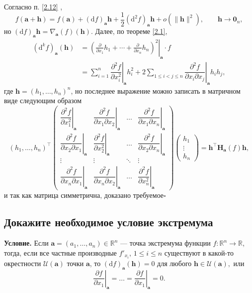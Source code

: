 \documentclass[a4paper]{article}
\newcommand{\qed}{\hfill$\square$}
\newcommand{\m}[1]{\mathbf{#1}}
\begin{document}
Согласно п. \ref{2.12} , 
$$
f(\m{a} + \m{h}) = f(\m{a}) + (\mathrm{d}f)_\m{a} \m{h} + \frac{1}{2} (\mathrm{d}^2f)_\m{a}\m{h} + o(\| \m{h} \|^2), \qquad \m{h} \to \m{0}_n,
$$
но $(\mathrm{d}f)_\m{a} \m{h} = \nabla_\m{a}(f)(\m{h})$. Далее, по теореме \ref{2.1},
$$\begin{aligned}
(\mathrm{d}^kf)_\m{a}(\m{h})  &= \left.\left(\frac{\partial}{\partial x_1} h_1 + \cdots + \frac{\partial }{\partial x_n}h_n \right)^2\right|_{\m{a}} \cdot f \\
&= \sum_{i=1}^n \left.\dfrac{\partial^2 f}{\partial x_i^2} \right|_\m{a} h_i^2 + 2 \sum_{1\le i < j \le n}  \left.\dfrac{\partial^2 f}{\partial x_i \partial x_j} \right|_{\m{a}} h_ih_j,
\end{aligned}$$
где $\m{h} = (h_1, \ldots, h_n)^n$, но последнее выражение можно записать в матричном виде следующим образом
$$
(h_1, \ldots, h_n)^\top \begin{pmatrix}
\left.\dfrac{\partial^2 f}{\partial x_1^2}\right|_{\m{a}} & \left.\dfrac{\partial^2 f}{\partial x_1 \partial x_2}\right|_{\m{a}} &\ldots & \left.\dfrac{\partial^2 f}{\partial x_1 \partial x_n}\right|_{\m{a}} \\
\left.\dfrac{\partial^2 f}{\partial x_2 \partial x_1}\right|_{\m{a}} & \left.\dfrac{\partial^2 f}{\partial x_2^2}\right|_{\m{a}} & \ldots & \left.\dfrac{\partial^2 f}{\partial x_2 \partial x_n}\right|_{\m{a}} \\
\vdots & \vdots & \ddots & \vdots \\
\left.\dfrac{\partial^2 f}{\partial x_n \partial x_1}\right|_{\m{a}} & \left.\dfrac{\partial^2 f}{\partial x_n \partial x_2}\right|_{\m{a}} & \ldots &\left.\dfrac{\partial^2 f}{ \partial x_n^2}\right|_{\m{a}}
\end{pmatrix} \begin{pmatrix}
h_1 \\ \vdots \\ h_n
\end{pmatrix}  =  \m{h}^\top \m{H}_\m{a}(f) \m{h} ,
$$
и так как матрица симметрична, доказано требуемое\qed
\label{2.13}

\subsection{Докажите необходимое условие экстремума}
\textbf{Условие.} Если $\m{a} = (a_1,\ldots, a_n) \in \mathbb{R}^n$ — точка экстремума функции $f:\mathbb{R}^n \to \mathbb{R}$, тогда, если все частные производные $f'_{x_i}$, $1\le i \le n$ существуют в какой-то окрестности $\mathscr{U}(\m{a})$ точки $\m{a}$, то $(\mathrm{d}f)_\m{a}(\m{h}) = 0$ для любого $\m{h} \in \mathscr{U}(\m{a}),$ или
$$
\left.\frac{\partial f}{\partial x_1}\right|_\m{a} = \ldots = \left.\frac{\partial f}{\partial x_1}\right|_\m{a} = 0.   
$$
\end{document}
